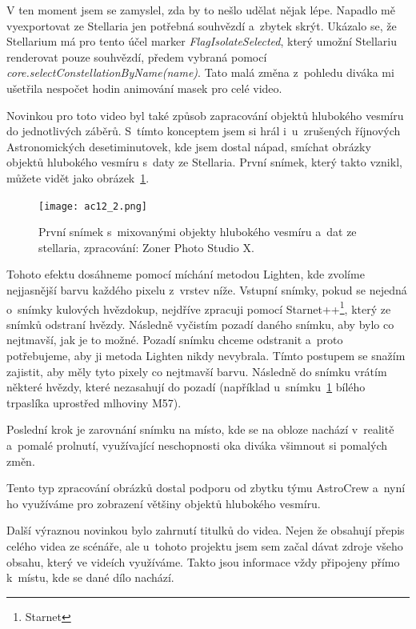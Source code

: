\documentclass[12pt,a4paper,titlepage]{article}
\begin{document}
V ten moment jsem se zamyslel, zda by to nešlo udělat nějak lépe. Napadlo mě vyexportovat ze Stellaria jen potřebná souhvězdí a~zbytek skrýt. Ukázalo se, že Stellarium má pro tento účel marker \textit{FlagIsolateSelected}, který umožní Stellariu renderovat pouze souhvězdí, předem vybraná pomocí \textit{core.\-select\-Constellation\-By\-Name(name)}. Tato malá změna z~pohledu diváka mi ušetřila nespočet hodin animování masek pro celé video. %

Novinkou pro toto video byl také způsob zapracování objektů hlubokého vesmíru do jednotlivých záběrů. S~tímto konceptem jsem si hrál i~u~zrušených říjnových Astronomických desetiminutovek, kde jsem dostal nápad, smíchat obrázky objektů hlubokého vesmíru s~daty ze Stellaria. První snímek, který takto vznikl, můžete vidět jako obrázek~\ref{prac:ac12_2}. 

\begin{figure}[H]
	\centering
	\texttt{[image: ac12\_2.png]}
	\caption{První snímek s~mixovanými objekty hlubokého vesmíru a~dat ze stellaria, zpracování: Zoner Photo Studio X.}\label{prac:ac12_2}
\end{figure}

Tohoto efektu dosáhneme pomocí míchání metodou Lighten, kde zvolíme nejjasnější barvu každého pixelu z~vrstev níže. Vstupní snímky, pokud se nejedná o~snímky kulových hvězdokup, nejdříve zpracuji pomocí Starnet++\footnote{Starnet}, který ze snímků odstraní hvězdy. Následně vyčistím pozadí daného snímku, aby bylo co nejtmavší, jak je to možné. Pozadí snímku chceme odstranit a~proto potřebujeme, aby ji metoda Lighten nikdy nevybrala. Tímto postupem se snažím zajistit, aby měly tyto pixely co nejtmavší barvu. Následně do snímku vrátím některé hvězdy, které nezasahují do pozadí (například u~snímku~\ref{prac:ac12_2} bílého trpaslíka uprostřed mlhoviny M57).

Poslední krok je zarovnání snímku na místo, kde se na obloze nachází v~realitě a~pomalé prolnutí, využívající neschopnosti oka diváka všimnout si pomalých změn.

Tento typ zpracování obrázků dostal podporu od zbytku týmu AstroCrew a~nyní ho využíváme pro zobrazení většiny objektů hlubokého vesmíru.

Další výraznou novinkou bylo zahrnutí titulků do videa. Nejen že obsahují přepis celého videa ze scénáře, ale u~tohoto projektu jsem sem začal dávat zdroje všeho obsahu, který ve videích využíváme. Takto jsou informace vždy připojeny přímo k~místu, kde se dané dílo nachází.
\end{document}

